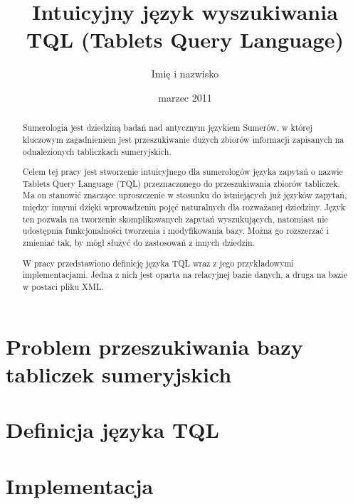 \documentclass{pracamgr}
\author{Imię i nazwisko}
\title{Intuicyjny język wyszukiwania TQL (Tablets Query Language)}
\date{marzec 2011}
\begin{document}
\maketitle

\begin{abstract}
Sumerologia jest dziedziną badań nad antycznym językiem Sumerów, w której
kluczowym zagadnieniem jest przeszukiwanie dużych zbiorów informacji
zapisanych na odnalezionych tabliczkach sumeryjskich.


Celem tej pracy jest stworzenie intuicyjnego dla sumerologów języka zapytań o nazwie Tablets Query Language (TQL)
 przeznaczonego do przeszukiwania zbiorów tabliczek.
Ma on stanowić znaczące uproszczenie w stosunku do istniejących już języków 
zapytań, między innymi dzięki wprowadzeniu pojęć naturalnych dla rozważanej dziedziny. 
Język ten pozwala na tworzenie skomplikowanych zapytań wyszukujących, natomiast 
nie udostępnia funkcjonalności tworzenia i modyfikowania bazy. 
Można go rozszerzać i zmieniać tak, by mógł służyć do zastosowań z innych 
dziedzin.

W pracy przedstawiono definicję języka TQL wraz z jego przykładowymi implementacjami. 
Jedna z nich jest oparta na relacyjnej bazie danych, a druga na bazie w postaci pliku XML.

\end{abstract}

\tableofcontents

\chapter{Problem przeszukiwania bazy tabliczek sumeryjskich}




\chapter{Definicja języka TQL}


\chapter{Implementacja}





\end{document}
